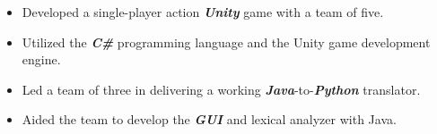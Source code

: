 \documentclass[10pt,a4paper,ragged2e,withhyper]{altacv}
\begin{document}
\begin{paracol}{2}

\begin{itemize}
\item Developed a single-player action \textbf{\textit{Unity}} game with a team of five.
\item Utilized the \textbf{\textit{C\#}} programming language and the Unity game development engine.
\end{itemize}

\divider


\begin{itemize}
\item Led a team of three in delivering a working \textbf{\textit{Java}}-to-\textbf{\textit{Python}} translator.  
\item Aided the team to develop the \textbf{\textit{GUI}} and lexical analyzer with Java.
\end{itemize}

\medskip







\end{paracol}
\end{document}
